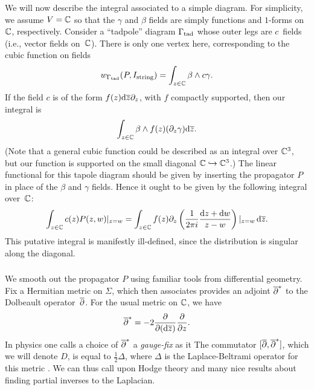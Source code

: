 We will now describe the integral associated to a simple diagram.
For simplicity, we assume $V = \mathbb C$ so that the $\gamma$ and $\beta$ fields are simply functions and $1$-forms on $\mathbb C$, respectively.
Consider a ``tadpole'' diagram $\Gamma_{\rm tad}$ whose outer legs are $c$~fields 
(i.e., vector fields on~$\mathbb C$).
There is only one vertex here, corresponding to the cubic function on fields
\[
w_{\Gamma_{\rm tad}}(P,I_{\rm string}) = \int_{z \in \mathbb C} \beta \wedge c\gamma.
\]
If the field $c$ is of the form $f(z) {\rm d} \overline{z} \partial_z$,
with $f$ compactly supported, 
then our integral is
\[
\int_{z \in \mathbb C} \beta \wedge f(z)(\partial_z\gamma) {\rm d} \overline{z}.
\]
(Note that a general cubic function could be described as an integral over $\mathbb C^3$,
but our function is supported on the small diagonal $\mathbb C \hookrightarrow \mathbb C^3$.)
The linear functional for this tapole diagram should be given by inserting the propagator $P$ in place of the $\beta$ and $\gamma$ fields. 
Hence it ought to be given by the following integral over~$\mathbb C$:
\[
\int_{z \in \mathbb C} c(z)P(z,w)|_{z = w}  
= \int_{z \in \mathbb C} f(z) \partial_z \left(  \frac{1}{2 \pi i} \frac{{\rm d} z + {\rm d} w}{z-w}\right)|_{z = w}\, {\rm d} \overline{z}.
\]
This putative integral is manifestly ill-defined,
since the distribution is singular along the diagonal.

\subsubsection{}

We smooth out the propagator $P$ using familiar tools from differential geometry.
Fix a Hermitian metric on $\Sigma$, 
which then associates provides an adjoint $\overline{\partial}^*$ to the Dolbeault operator~$\overline{\partial}$.
For the usual metric on $\mathbb C$, we have
\[
\overline{\partial}^* = -2 \frac{\partial}{\partial ({\rm d} \overline{z})} \frac{\partial}{\partial z}.
\]
In physics one calls a choice of $\overline{\partial}^*$ a {\em gauge-fix} as it 
The commutator $[\overline{\partial},\overline{\partial}^*]$, which we will denote $D$, 
is equal to $\tfrac{1}{2} \Delta$, where $\Delta$ is the Laplace-Beltrami operator for this metric .
We can thus call upon Hodge theory and many nice results about finding partial inverses to the Laplacian.


